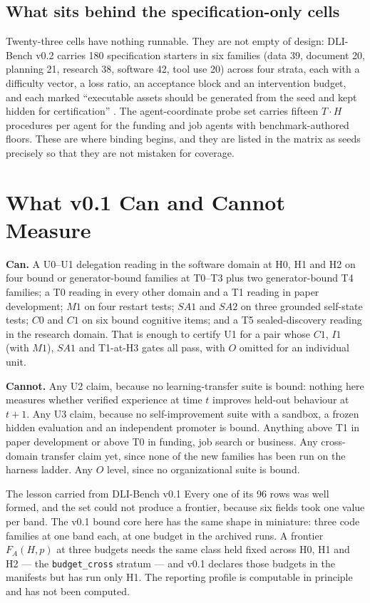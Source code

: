 \subsection{What sits behind the specification-only cells}

Twenty-three cells have nothing runnable. They are not empty of design: DLI-Bench v0.2 carries 180 specification starters in six families (data 39, document 20, planning 21, research 38, software 42, tool use 20) across four strata, each with a difficulty vector, a loss ratio, an acceptance block and an intervention budget, and each marked ``executable assets should be generated from the seed and kept hidden for certification'' \citep{yang2026dlibench}. The agent-coordinate probe set carries fifteen $T{\cdot}H$ procedures per agent for the funding and job agents with benchmark-authored floors. These are where binding begins, and they are listed in the matrix as seeds precisely so that they are not mistaken for coverage.

\section{What v0.1 Can and Cannot Measure}\label{sec:can}

\textbf{Can.} A U0--U1 delegation reading in the software domain at H0, H1 and H2 on four bound or generator-bound families at T0--T3 plus two generator-bound T4 families; a T0 reading in every other domain and a T1 reading in paper development; $M1$ on four restart tests; $SA1$ and $SA2$ on three grounded self-state tests; $C0$ and $C1$ on six bound cognitive items; and a T5 sealed-discovery reading in the research domain. That is enough to certify U1 for a pair whose $C1$, $I1$ (with $M1$), $SA1$ and T1-at-H3 gates all pass, with $O$ omitted for an individual unit.

\textbf{Cannot.} Any U2 claim, because no learning-transfer suite is bound: nothing here measures whether verified experience at time $t$ improves held-out behaviour at $t+1$. Any U3 claim, because no self-improvement suite with a sandbox, a frozen hidden evaluation and an independent promoter is bound. Anything above T1 in paper development or above T0 in funding, job search or business. Any cross-domain transfer claim yet, since none of the new families has been run on the harness ladder. Any $O$ level, since no organizational suite is bound.

\begin{cautionbox}{The lesson carried from DLI-Bench v0.1}
Every one of its 96 rows was well formed, and the set could not produce a frontier, because six fields took one value per band. The v0.1 bound core here has the same shape in miniature: three code families at one band each, at one budget in the archived runs. A frontier $F_A(H,p)$ at three budgets needs the same class held fixed across H0, H1 and H2 --- the \texttt{budget\_cross} stratum --- and v0.1 declares those budgets in the manifests but has run only H1. The reporting profile is computable in principle and has not been computed.
\end{cautionbox}

